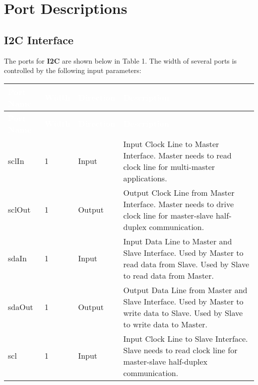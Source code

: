 \section{Port Descriptions}

\subsection{I2C Interface}

The ports for \textbf{I2C} are shown below in 
Table 1. The width of several ports is controlled 
by the following input parameters:

\renewcommand*{\arraystretch}{1.4}

\begingroup
\small


\begin{longtable}[H]{
  | p{}
  | p{}
  | p{}
  | p{} |
}

\hline
\rowcolor{gray}
\textcolor{white}{\textbf{Port Name}} & 
\textcolor{white}{\textbf{Width}} & 
\textcolor{white}{\textbf{Direction}} & 
\textcolor{white}{\textbf{Description}} \\ \hline
\endfirsthead

\hline
\rowcolor{gray}
\textcolor{white}{\textbf{Port Name}} & 
\textcolor{white}{\textbf{Width}} & 
\textcolor{white}{\textbf{Direction}} & 
\textcolor{white}{\textbf{Description}}\\ \hline
\endhead

\hline
\endfoot

sclIn & 
1 & 
Input &
Input Clock Line to Master Interface. Master needs to read clock line for multi-master applications. \\ \hline

sclOut &
1 &
Output &
Output Clock Line from Master Interface. Master needs to drive clock line for master-slave half-duplex communication. \\ \hline

sdaIn &
1 &
Input &
Input Data Line to Master and Slave Interface. Used by Master to read data from Slave. Used by Slave to read data from Master. \\ \hline

sdaOut &
1 &
Output &
Output Data Line from Master and Slave Interface. Used by Master to write data to Slave. Used by Slave to write data to Master. \\ \hline

scl & 
1 & 
Input & 
Input Clock Line to Slave Interface. Slave needs to read clock line for master-slave half-duplex communication. \\ \hline

\end{longtable}
\captionsetup{aboveskip=0pt}
\label{table:ports}
\endgroup

